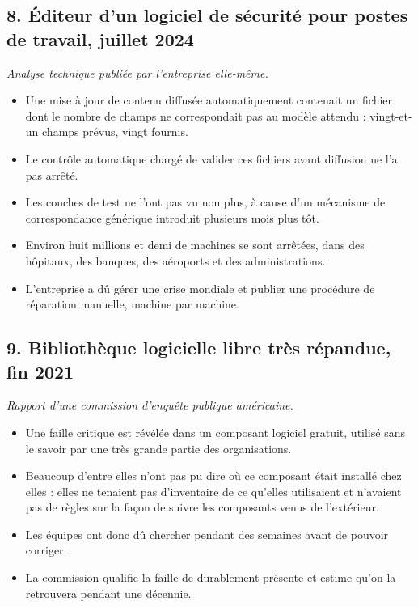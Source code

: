 \documentclass[11pt,a4paper]{article}
\begin{document}
\subsection*{8. Éditeur d'un logiciel de sécurité pour postes de travail, juillet 2024}
\textit{Analyse technique publiée par l'entreprise elle-même.}
\begin{itemize}[itemsep=2pt]
\item Une mise à jour de contenu diffusée automatiquement contenait un fichier dont le nombre de
      champs ne correspondait pas au modèle attendu : vingt-et-un champs prévus, vingt fournis.
\item Le contrôle automatique chargé de valider ces fichiers avant diffusion ne l'a pas arrêté.
\item Les couches de test ne l'ont pas vu non plus, à cause d'un mécanisme de correspondance
      générique introduit plusieurs mois plus tôt.
\item Environ huit millions et demi de machines se sont arrêtées, dans des hôpitaux, des banques,
      des aéroports et des administrations.
\item L'entreprise a dû gérer une crise mondiale et publier une procédure de réparation manuelle,
      machine par machine.
\end{itemize}

\subsection*{9. Bibliothèque logicielle libre très répandue, fin 2021}
\textit{Rapport d'une commission d'enquête publique américaine.}
\begin{itemize}[itemsep=2pt]
\item Une faille critique est révélée dans un composant logiciel gratuit, utilisé sans le savoir
      par une très grande partie des organisations.
\item Beaucoup d'entre elles n'ont pas pu dire où ce composant était installé chez elles : elles
      ne tenaient pas d'inventaire de ce qu'elles utilisaient et n'avaient pas de règles sur la
      façon de suivre les composants venus de l'extérieur.
\item Les équipes ont donc dû chercher pendant des semaines avant de pouvoir corriger.
\item La commission qualifie la faille de durablement présente et estime qu'on la retrouvera
      pendant une décennie.
\end{itemize}
\end{document}
